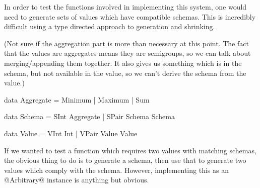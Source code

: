 In order to test the functions involved in implementing this system, one would need to generate sets of values which have compatible schemas. This is incredibly difficult using a type directed approach to generation and shrinking.

(Not sure if the aggregation part is more than necessary at this point. The fact that the values are aggregates means they are semigroups, so we can talk about merging/appending them together. It also gives us something which is in the schema, but not available in the value, so we can't derive the schema from the value.)

\begin{code}
  data Aggregate =
      Minimum
    | Maximum
    | Sum

  data Schema =
      SInt Aggregate
    | SPair Schema Schema

  data Value =
      VInt Int
    | VPair Value Value
\end{code}

If we wanted to test a function which requires two values with matching schemas, the obvious thing to do is to generate a schema, then use that to generate two values which comply with the schema. However, implementing this as an @Arbitrary@ instance is anything but obvious.

